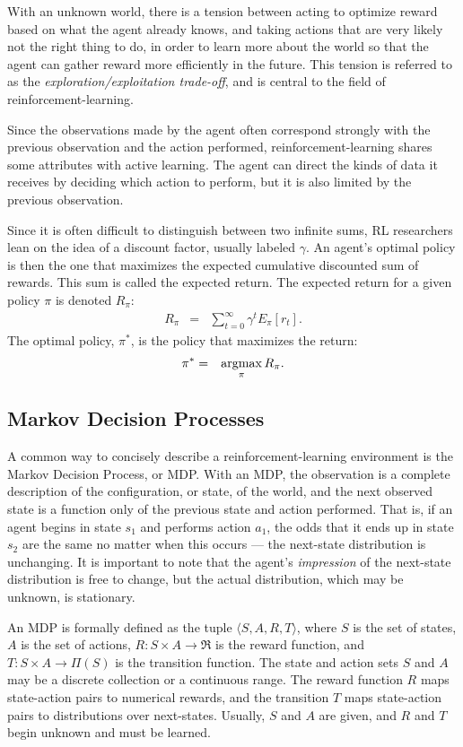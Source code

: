 With an unknown world, there is a tension between acting to optimize reward based on what the agent already knows, and taking actions that are very likely not the right thing to do, in order to learn more about the world so that the agent can gather reward more efficiently in the future. This tension is referred to as the \emph{exploration/exploitation trade-off}, and is central to the field of reinforcement-learning.

Since the observations made by the agent often correspond strongly with the previous observation and the action performed, reinforcement-learning shares some attributes with active learning. The agent can direct the kinds of data it receives by deciding which action to perform, but it is also limited by the previous observation.

Since it is often difficult to distinguish between two infinite sums, RL researchers lean on the idea of a discount factor, usually labeled $\gamma$. An agent's optimal policy is then the one that maximizes the expected cumulative discounted sum of rewards. This sum is called the expected return. The expected return for a given policy $\pi$ is denoted $R_\pi$:
\begin{eqnarray}
R_\pi &=& \sum_{t=0}^\infty \gamma^t E_\pi[r_t].
\end{eqnarray}
The optimal policy, $\pi^*$, is the policy that maximizes the return:
\begin{eqnarray}
\pi^* &=& \argmax_\pi R_\pi.
\end{eqnarray}


\subsection{Markov Decision Processes}

A common way to concisely describe a reinforcement-learning environment is the Markov Decision Process, or MDP. With an MDP, the observation is a complete description of the configuration, or state, of the world, and the next observed state is a function only of the previous state and action performed. That is, if an agent begins in state $s_1$ and performs action $a_1$, the odds that it ends up in state $s_2$ are the same no matter when this occurs --- the next-state distribution is unchanging. It is important to note that the agent's \emph{impression} of the next-state distribution is free to change, but the actual distribution, which may be unknown, is stationary.

An MDP is formally defined as the tuple $\langle S, A, R, T \rangle$, where $S$ is the set of states, $A$ is the set of actions, $R:S \times A \rightarrow \Re$ is the reward function, and $T:S \times A \rightarrow \Pi(S)$ is the transition function. The state and action sets $S$ and $A$ may be a discrete collection or a continuous range. The reward function $R$ maps state-action pairs to numerical rewards, and the transition $T$ maps state-action pairs to distributions over next-states. Usually, $S$ and $A$ are given, and $R$ and $T$ begin unknown and must be learned.

